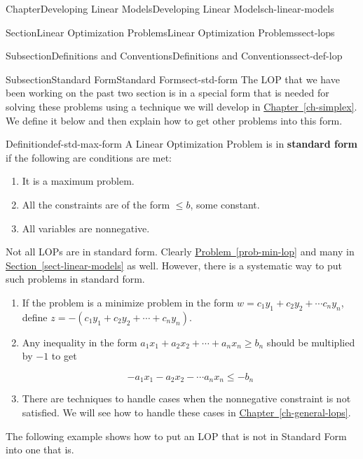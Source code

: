 \documentclass[oneside,10pt,]{book}
\newcommand{\xreffont}{\relax}
\newcommand{\terminology}[1]{\textbf{#1}}
\numberwithin{equation}{section}
\begin{document}
\begin{chapterptx}{Chapter}{Developing Linear Models}{}{Developing Linear Models}{}{}{ch-linear-models}
\begin{sectionptx}{Section}{Linear Optimization Problems}{}{Linear Optimization Problems}{}{}{sect-lops}
\begin{subsectionptx}{Subsection}{Definitions and Conventions}{}{Definitions and Conventions}{}{}{sect-def-lop}
\end{subsectionptx}
%
%
\typeout{************************************************}
\typeout{************************************************}
%
\begin{subsectionptx}{Subsection}{Standard Form}{}{Standard Form}{}{}{sect-std-form}
The LOP that we have been working on the past two section is in a special form that is needed for solving these problems using a technique we will develop in \hyperref[ch-simplex]{Chapter~{\xreffont\ref{ch-simplex}}}. We define it below and then explain how to get other problems into this form.%
\begin{definition}{Definition}{}{def-std-max-form}%
A Linear Optimization Problem is in \terminology{standard form} if the following are conditions are met:%
\begin{enumerate}
\item{}It is a maximum problem.%
\item{}All the constraints are of the form \(\leq b\), some constant.%
\item{}All variables are nonnegative.%
\end{enumerate}
%
\end{definition}
Not all LOPs are in standard form. Clearly \hyperref[prob-min-lop]{Problem~{\xreffont\ref{prob-min-lop}}} and many in \hyperref[sect-linear-models]{Section~{\xreffont\ref{sect-linear-models}}} as well. However, there is a systematic way to put such problems in standard form.%
\par
%
\begin{enumerate}
\item{}If the problem is a minimize problem in the form \(w = c_1 y_1 + c_2 y_2 + \cdots c_n y_n\), define \(z=-(c_1 y_1 + c_2 y_2 + \cdots + c_n y_n)\).%
\item{}Any inequality in the form \(a_1 x_1 + a_2 x_2 + \cdots + a_n x_n \geq b_n \) should be multiplied by \(-1\) to get%
\par
%
\begin{equation*}
-a_1 x_1 - a_2 x_2 - \cdots a_n x_n \leq -b_n
\end{equation*}
%
\item{}There are techniques to handle cases when the nonnegative constraint is not satisfied.  We will see how to handle these cases in \hyperref[ch-general-lops]{Chapter~{\xreffont\ref{ch-general-lops}}}.%
\end{enumerate}
%
\par
The following example shows how to put an LOP that is not in Standard Form into one that is.%

\end{subsectionptx}
\end{sectionptx}
\end{chapterptx}
\end{document}

